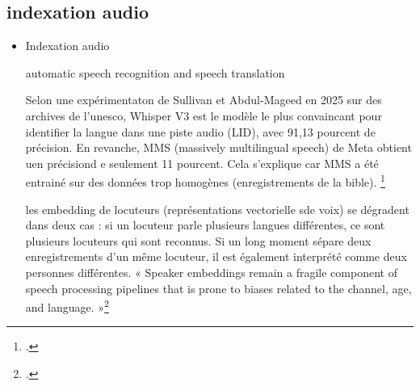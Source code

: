 \subsection{indexation audio}
\begin{itemize}



\item Indexation audio

automatic speech recognition and speech translation

Selon une expérimentaton de Sullivan et Abdul-Mageed en 2025 sur des archives de l'unesco, Whisper V3 est le modèle le plus convaincant pour identifier la langue dans une piste audio (LID), avec 91,13 pourcent de précision. En revanche, MMS (massively multilingual speech) de Meta obtient uen précisiond e seulement 11 pourcent. Cela s'explique car MMS a été entrainé sur des données trop homogènes (enregistrements de la bible). 
\footcite{sullivan2025}

les embedding de locuteurs (représentations vectorielle sde voix) se dégradent dans deux cas : si un locuteur parle plusieurs langues différentes, ce sont plusieurs locuteurs qui sont reconnus. Si un long moment sépare deux enregistrements d'un même locuteur, il est également interprété comme deux personnes différentes. « Speaker embeddings remain a fragile component of speech processing pipelines that is prone to biases related to the channel, age, and language. »\footcite{sullivan2025}

\end{itemize}